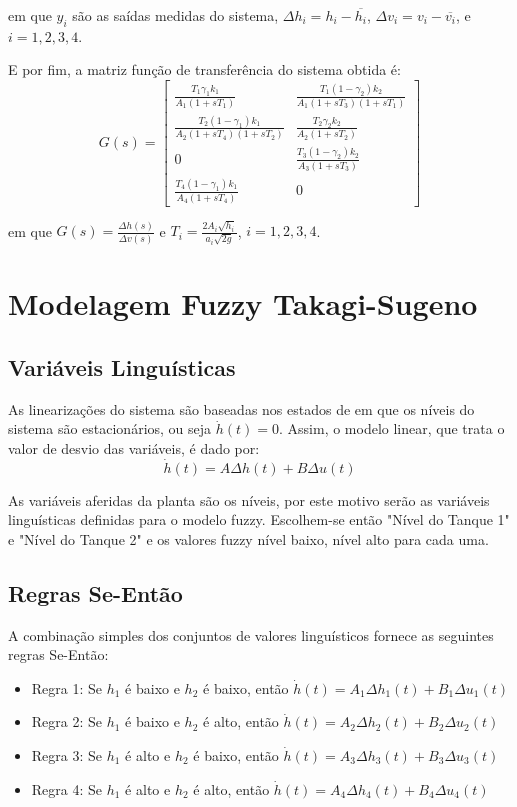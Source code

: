 em que $y_{i}$ são as saídas medidas do sistema, $\Delta h_{i}=h_{i} - \overline{h_{i}}$, $\Delta v_{i}=v_{i} - \overline{v_{i}}$, e $i=1,2,3,4$.

E por fim, a matriz função de transferência do sistema obtida é:
\begin{equation}
	G(s) = 
	\begin{bmatrix}
		\frac{T_{1}\gamma_{1}k_{1}}{A_{1}(1+sT_{1})} &  \frac{T_{1}(1-\gamma_{2})k_{2}}{A_{1}(1+sT_{3})(1+sT_{1})} \\
		\frac{T_{2}(1-\gamma_{1})k_{1}}{A_{2}(1+sT_{4})(1+sT_{2})} &  \frac{T_{2}\gamma_{2}k_{2}}{A_{2}(1+sT_{2})} \\
		0 &  \frac{T_{3}(1-\gamma_{2})k_{2}}{A_{3}(1+sT_{3})} \\
		\frac{T_{4}(1-\gamma_{1})k_{1}}{A_{4}(1+sT_{4})} &  0 
	\end{bmatrix} 
	\label{eq4}
\end{equation}

em que $G(s)=\frac{\Delta h(s)}{\Delta v(s)}$ e $T_{i}=\frac{2A_{i}\sqrt{h_{i}}}{a_{i}\sqrt{2g}}$, $i=1,2,3,4$.

\section{Modelagem Fuzzy Takagi-Sugeno} \label{secModFuzzy}
\subsection{Variáveis Linguísticas}
	As linearizações do sistema são baseadas nos estados de em que os níveis do sistema são  estacionários, ou seja $\dot{h}(t) = 0$. Assim, o modelo linear, que trata o valor de desvio das variáveis, é dado por: 
		\begin{equation}
			\dot{h}(t) =  A \Delta h(t) +  B \Delta u(t)
		\end{equation}

	As variáveis aferidas da planta são os níveis, por este motivo serão as variáveis linguísticas definidas para o modelo fuzzy. Escolhem-se então "Nível do Tanque 1" e "Nível do Tanque 2" e os valores fuzzy {nível baixo, nível alto} para cada uma.

\subsection{Regras Se-Então}
	A combinação simples dos conjuntos de valores linguísticos fornece as seguintes regras Se-Então:
	\begin{itemize}
		\centering
		\item Regra 1: Se $h_1$ é baixo e $h_2$ é baixo, então $\dot{h}(t) =  A_1 \Delta h_1(t) +  B_1 \Delta u_1(t)$
		\item Regra 2: Se $h_1$ é baixo e $h_2$ é alto, então $\dot{h}(t) =  A_2 \Delta h_2(t) +  B_2 \Delta u_2(t)$
		\item Regra 3: Se $h_1$ é alto e $h_2$ é baixo, então $\dot{h}(t) =  A_3 \Delta h_3(t) +  B_3 \Delta u_3(t)$
		\item Regra 4: Se $h_1$ é alto e $h_2$ é alto, então $\dot{h}(t) =  A_4 \Delta h_4(t) +  B_4 \Delta u_4(t)$
	\end{itemize}

